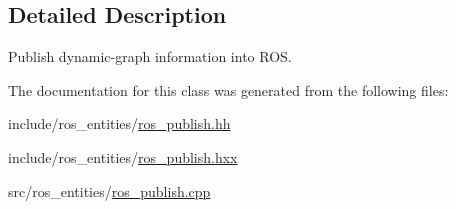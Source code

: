 \subsection{Detailed Description}
Publish dynamic-\/graph information into R\+OS. 

The documentation for this class was generated from the following files\+:\begin{DoxyCompactItemize}
\item 
include/ros\+\_\+entities/\hyperlink{ros__publish_8hh}{ros\+\_\+publish.\+hh}\item 
include/ros\+\_\+entities/\hyperlink{ros__publish_8hxx}{ros\+\_\+publish.\+hxx}\item 
src/ros\+\_\+entities/\hyperlink{ros__publish_8cpp}{ros\+\_\+publish.\+cpp}\end{DoxyCompactItemize}
